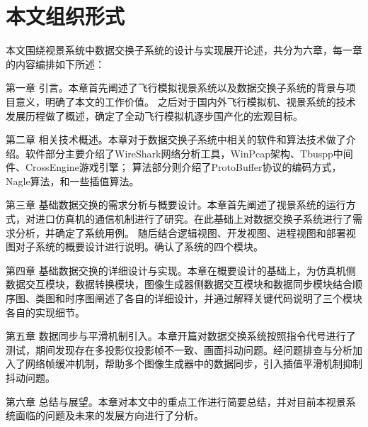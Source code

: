\section{本文组织形式}
本文围绕视景系统中数据交换子系统的设计与实现展开论述，共分为六章，每一章的内容编排如下所述：\par
第一章 引言。本章首先阐述了飞行模拟视景系统以及数据交换子系统的背景与项目意义，明确了本文的工作价值。
       之后对于国内外飞行模拟机、视景系统的技术发展历程做了概述，确定了全动飞行模拟机逐步国产化的宏观目标。\par
第二章 相关技术概述。本章对于数据交换子系统中相关的软件和算法技术做了介绍。软件部分主要介绍了WireShark网络分析工具，WinPcap架构、Tbuspp中间件、CrossEngine游戏引擎；
       算法部分则介绍了ProtoBuffer协议的编码方式，Nagle算法，和一些插值算法。\par
第三章 基础数据交换的需求分析与概要设计。本章首先阐述了视景系统的运行方式，对进口仿真机的通信机制进行了研究。在此基础上对数据交换子系统进行了需求分析，并确定了系统用例。
       随后结合逻辑视图、开发视图、进程视图和部署视图对子系统的概要设计进行说明。确认了系统的四个模块。\par
第四章 基础数据交换的详细设计与实现。本章在概要设计的基础上，为仿真机侧数据交互模块，数据转换模块，图像生成器侧数据交互模块和数据同步模块结合顺序图、类图和时序图阐述了各自的详细设计，并通过解释关键代码说明了三个模块各自的实现细节。\par
       
第五章 数据同步与平滑机制引入。本章开篇对数据交换系统按照指令代号进行了测试，期间发现存在多投影仪投影帧不一致、画面抖动问题。经问题排查与分析加入了网络帧缓冲机制，帮助多个图像生成器中的数据同步，引入插值平滑机制抑制抖动问题。\par
第六章 总结与展望。本章对本文中的重点工作进行简要总结，并对目前本视景系统面临的问题及未来的发展方向进行了分析。